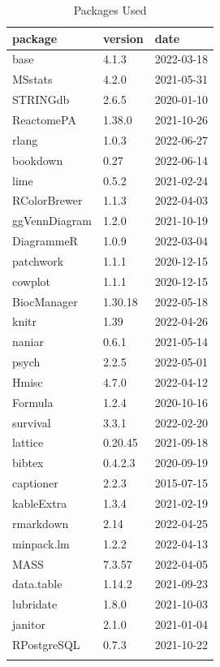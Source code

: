 \documentclass[
]{article}
\begin{document}
\begin{landscape}
\begin{landscape}
\clearpage

\begin{table}

\caption{\label{tab:package-table}Packages Used}
\centering
\begin{tabular}[t]{lll}
\toprule
package & version & date\\
\midrule
base & 4.1.3 & 2022-03-18\\
MSstats & 4.2.0 & 2021-05-31\\
STRINGdb & 2.6.5 & 2020-01-10\\
ReactomePA & 1.38.0 & 2021-10-26\\
rlang & 1.0.3 & 2022-06-27\\
\addlinespace
bookdown & 0.27 & 2022-06-14\\
lime & 0.5.2 & 2021-02-24\\
RColorBrewer & 1.1.3 & 2022-04-03\\
ggVennDiagram & 1.2.0 & 2021-10-19\\
DiagrammeR & 1.0.9 & 2022-03-04\\
\addlinespace
patchwork & 1.1.1 & 2020-12-15\\
cowplot & 1.1.1 & 2020-12-15\\
BiocManager & 1.30.18 & 2022-05-18\\
knitr & 1.39 & 2022-04-26\\
naniar & 0.6.1 & 2021-05-14\\
\addlinespace
psych & 2.2.5 & 2022-05-01\\
Hmisc & 4.7.0 & 2022-04-12\\
Formula & 1.2.4 & 2020-10-16\\
survival & 3.3.1 & 2022-02-20\\
lattice & 0.20.45 & 2021-09-18\\
\addlinespace
bibtex & 0.4.2.3 & 2020-09-19\\
captioner & 2.2.3 & 2015-07-15\\
kableExtra & 1.3.4 & 2021-02-19\\
rmarkdown & 2.14 & 2022-04-25\\
minpack.lm & 1.2.2 & 2022-04-13\\
\addlinespace
MASS & 7.3.57 & 2022-04-05\\
data.table & 1.14.2 & 2021-09-23\\
lubridate & 1.8.0 & 2021-10-03\\
janitor & 2.1.0 & 2021-01-04\\
RPostgreSQL & 0.7.3 & 2021-10-22\\
\addlinespace

\end{tabular}
\end{table}
\end{landscape}
\end{landscape}
\end{document}
